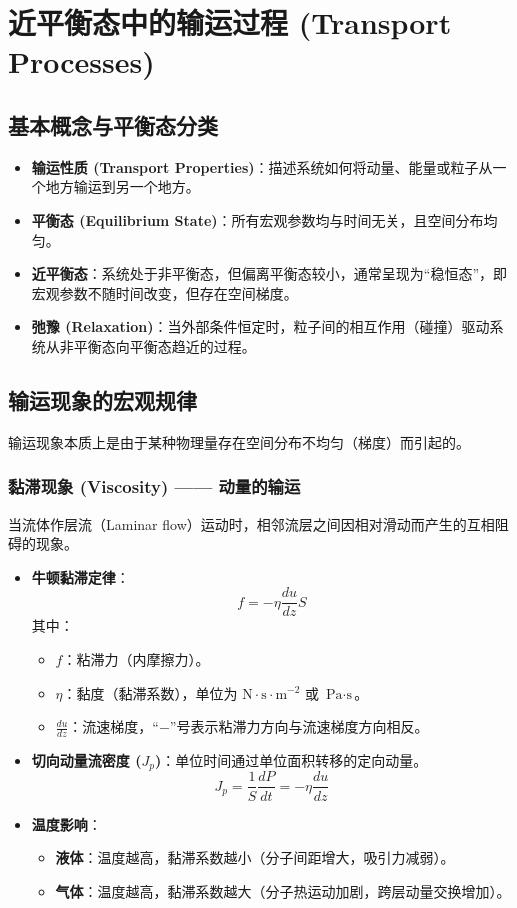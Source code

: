 \documentclass{article}
\begin{document}
\section{近平衡态中的输运过程 (Transport Processes)}

\subsection{基本概念与平衡态分类}
\begin{itemize}
    \item \textbf{输运性质 (Transport Properties)}：描述系统如何将动量、能量或粒子从一个地方输运到另一个地方。
    \item \textbf{平衡态 (Equilibrium State)}：所有宏观参数均与时间无关，且空间分布均匀。
    \item \textbf{近平衡态}：系统处于非平衡态，但偏离平衡态较小，通常呈现为“稳恒态”，即宏观参数不随时间改变，但存在空间梯度。
    \item \textbf{弛豫 (Relaxation)}：当外部条件恒定时，粒子间的相互作用（碰撞）驱动系统从非平衡态向平衡态趋近的过程。
\end{itemize}

\subsection{输运现象的宏观规律}
输运现象本质上是由于某种物理量存在空间分布不均匀（梯度）而引起的。

\subsubsection{黏滞现象 (Viscosity) —— 动量的输运}
当流体作层流（Laminar flow）运动时，相邻流层之间因相对滑动而产生的互相阻碍的现象。
\begin{itemize}
    \item \textbf{牛顿黏滞定律}：
    \[ f = -\eta \frac{du}{dz} S \]
    其中：
    \begin{itemize}
        \item $f$：粘滞力（内摩擦力）。
        \item $\eta$：黏度（黏滞系数），单位为 $\text{N} \cdot \text{s} \cdot \text{m}^{-2}$ 或 $\text{Pa} \cdot \text{s}$。
        \item $\frac{du}{dz}$：流速梯度，“$-$”号表示粘滞力方向与流速梯度方向相反。
    \end{itemize}
    \item \textbf{切向动量流密度 ($J_p$)}：单位时间通过单位面积转移的定向动量。
    \[ J_p = \frac{1}{S} \frac{dP}{dt} = -\eta \frac{du}{dz} \]
    \item \textbf{温度影响}：
    \begin{itemize}
        \item \textbf{液体}：温度越高，黏滞系数越小（分子间距增大，吸引力减弱）。
        \item \textbf{气体}：温度越高，黏滞系数越大（分子热运动加剧，跨层动量交换增加）。
    \end{itemize}
\end{itemize}
\end{document}
